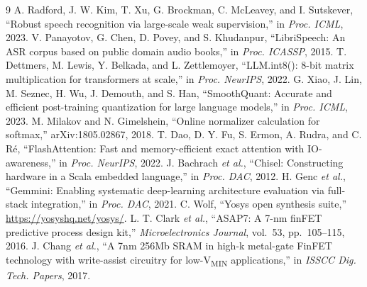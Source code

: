 \documentclass[conference]{IEEEtran}
\begin{document}
\begin{thebibliography}{9}
 A. Radford, J. W. Kim, T. Xu, G. Brockman, C. McLeavey, and I. Sutskever, ``Robust speech recognition via large-scale weak supervision,'' in \emph{Proc. ICML}, 2023.
 V. Panayotov, G. Chen, D. Povey, and S. Khudanpur, ``LibriSpeech: An ASR corpus based on public domain audio books,'' in \emph{Proc. ICASSP}, 2015.
 T. Dettmers, M. Lewis, Y. Belkada, and L. Zettlemoyer, ``LLM.int8(): 8-bit matrix multiplication for transformers at scale,'' in \emph{Proc. NeurIPS}, 2022.
 G. Xiao, J. Lin, M. Seznec, H. Wu, J. Demouth, and S. Han, ``SmoothQuant: Accurate and efficient post-training quantization for large language models,'' in \emph{Proc. ICML}, 2023.
 M. Milakov and N. Gimelshein, ``Online normalizer calculation for softmax,'' arXiv:1805.02867, 2018.
 T. Dao, D. Y. Fu, S. Ermon, A. Rudra, and C. R\'e, ``FlashAttention: Fast and memory-efficient exact attention with IO-awareness,'' in \emph{Proc. NeurIPS}, 2022.
 J. Bachrach \emph{et al.}, ``Chisel: Constructing hardware in a Scala embedded language,'' in \emph{Proc. DAC}, 2012.
 H. Genc \emph{et al.}, ``Gemmini: Enabling systematic deep-learning architecture evaluation via full-stack integration,'' in \emph{Proc. DAC}, 2021.
 C. Wolf, ``Yosys open synthesis suite,'' \url{https://yosyshq.net/yosys/}.
 L. T. Clark \emph{et al.}, ``ASAP7: A 7-nm finFET predictive process design kit,'' \emph{Microelectronics Journal}, vol.~53, pp.~105--115, 2016.
 J. Chang \emph{et al.}, ``A 7nm 256Mb SRAM in high-k metal-gate FinFET technology with write-assist circuitry for low-V\textsubscript{MIN} applications,'' in \emph{ISSCC Dig. Tech. Papers}, 2017.
\end{thebibliography}
\end{document}
